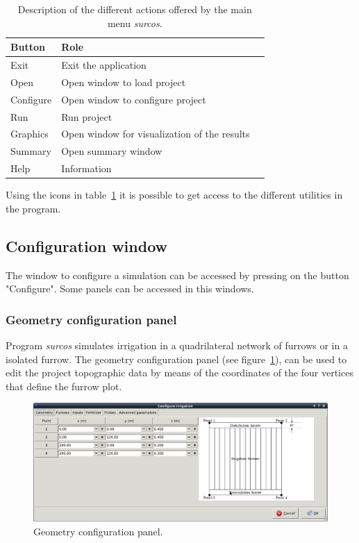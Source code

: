 \documentclass[review,authoryear]{elsarticle}
\begin{document}
\begin{table}[!ht]\footnotesize
\caption{Description of the different actions offered by the main menu
	\emph{surcos}.}\label{mainWindowIcons}
\begin{center}
\begin{tabular}{llr}
\hline
Button & Role \\
\hline
Exit & Exit the application\\
Open & Open window to load project \\
Configure & Open window to configure project \\
Run & Run project \\
Graphics & Open window for visualization of the results  \\
Summary & Open summary window \\
Help & Information \\
\hline
\end{tabular}
\end{center}
\end{table}

Using the icons in table~\ref{mainWindowIcons} it is possible to get access to
the different utilities in the program.

\subsection{Configuration window}

The window to configure a simulation can be accessed by pressing on the button
"Configure". Some panels can be accessed in this windows.

\subsubsection{Geometry configuration panel}

Program \emph{surcos} simulates irrigation in a quadrilateral network of
furrows or in a isolated furrow. The geometry configuration panel (see
figure~\ref{geomWindow}), can be used to edit the project topographic data by
means of the coordinates of the four vertices that define the furrow plot.

\begin{figure}[!ht]
\begin{center}
\includegraphics[width=1125\UNIT]{confGeomEN.eps}
\caption{Geometry configuration panel.}\label{geomWindow}
\end{center}
\end{figure}
\end{document}
